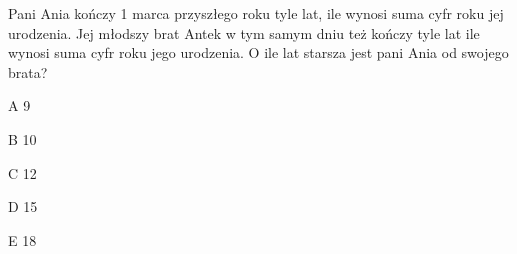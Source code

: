 \begin{tresc}
Pani Ania kończy 1 marca przyszłego roku tyle lat, ile wynosi suma cyfr roku jej urodzenia. Jej młodszy brat Antek w tym samym dniu też kończy tyle lat ile wynosi suma cyfr roku jego urodzenia. O ile lat starsza jest pani Ania od swojego brata?
\end{tresc}
\begin{wariant}{A} 9 \end{wariant}
\begin{wariant}{B} 10 \end{wariant}
\begin{wariant}{C} 12 \end{wariant}
\begin{wariant}{D} 15 \end{wariant}
\begin{wariant}{E} 18 \end{wariant}

